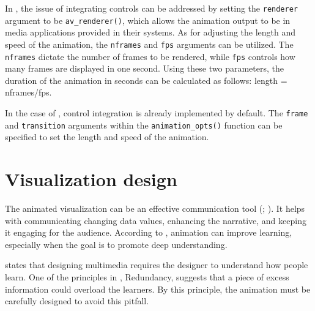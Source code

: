 In , the issue of integrating controls can be addressed by setting the \texttt{renderer} argument to be \texttt{av\_renderer()}, which allows the animation output to be in media applications provided in their systems. As for adjusting the length and speed of the animation, the \texttt{nframes} and \texttt{fps} arguments can be utilized. The \texttt{nframes} dictate the number of frames to be rendered, while \texttt{fps} controls how many frames are displayed in one second. Using these two parameters, the duration of the animation in seconds can be calculated as follows: length = nframes/fps.

In the case of , control integration is already implemented by default. The \texttt{frame} and \texttt{transition} arguments within the \texttt{animation\_opts()} function can be specified to set the length and speed of the animation.

\section{Visualization design}\label{design}

The animated visualization can be an effective communication tool (\citet{Mayer_Moreno_2002}; \citet{effective-trend}). It helps with communicating changing data values, enhancing the narrative, and keeping it engaging for the audience. According to \citet{Mayer_Moreno_2002}, animation can improve learning, especially when the goal is to promote deep understanding.

\citet{mayer_2005} states that designing multimedia requires the designer to understand how people learn. One of the principles in \citet{mayer_2005}, Redundancy, suggests that a piece of excess information could overload the learners. By this principle, the animation must be carefully designed to avoid this pitfall.

